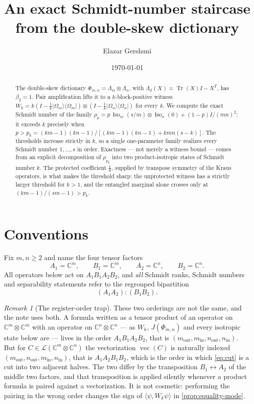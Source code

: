 \documentclass[11pt,reqno]{amsart}
\title{An exact Schmidt-number staircase\\
from the double-skew dictionary}
\author{Elazar Gershuni}
\date{\today}
\theoremstyle{plain}
\theoremstyle{remark}
\newtheorem{remark}[theorem]{Remark}
\DeclareMathOperator{\Tr}{Tr}
\DeclareMathOperator{\vecop}{vec}
\DeclareMathOperator{\Iso}{Iso}
\newcommand{\cL}{\mathcal L}
\newcommand{\ketbra}[2]{\lvert #1\rangle\!\langle #2\rvert}
\newcommand{\ip}[2]{\langle #1,#2\rangle}
\newcommand{\C}{\mathbb C}
\begin{document}
\begin{abstract}
The double-skew dictionary $\Phi_{m,n}=\Lambda_m\otimes\Lambda_n$, with
$\Lambda_d(X)=\Tr(X)I-X^T$, has $\beta_2=1$.  Pair amplification lifts it to a
$k$-block-positive witness
$W_k=k(I-\frac1k\ketbra{\Omega_m}{\Omega_m})
\otimes(I-\frac1k\ketbra{\Omega_n}{\Omega_n})$ for every $k$.  We compute the
exact Schmidt number of the family
$\rho_p=p\,\Iso_m(s/m)\otimes\Iso_n(0)+(1-p)I/(mn)^2$: it exceeds $k$ precisely
when $p>p_k=(km-1)(kn-1)/[(km-1)(kn-1)+kmn(s-k)]$.  The thresholds increase
strictly in $k$, so a single one-parameter family realizes every Schmidt number
$1,\ldots,s$ in order.  Exactness --- not merely a witness bound --- comes from
an explicit decomposition of $\rho_{p_k}$ into two product-isotropic states of
Schmidt number $k$.  The protected coefficient $\frac1k$, supplied by transpose
symmetry of the Kraus operators, is what makes the threshold sharp: the
unprotected witness has a strictly larger threshold for $k>1$, and the
entangled marginal alone crosses only at $(km-1)/(sm-1)>p_k$.
\end{abstract}
\maketitle

\section{Conventions}

Fix $m,n\ge2$ and name the four tensor factors
\[
    A_1=\C^m,\qquad B_1=\C^m,\qquad A_2=\C^n,\qquad B_2=\C^n .
\]
All operators below act on $A_1B_1A_2B_2$, and \emph{all} Schmidt ranks,
Schmidt numbers and separability statements refer to the regrouped
bipartition
\begin{equation}
\label{eq:cut}
    (A_1A_2):(B_1B_2).
\end{equation}

\begin{remark}[The register-order trap]
\label{rem:order}
These two orderings are not the same, and the note uses both.  A formula
written as a tensor product of an operator on $\C^m\otimes\C^m$ with an
operator on $\C^n\otimes\C^n$ --- as $W_k$, $J(\Phi_{m,n})$ and every isotropic
state below are --- lives in the order $A_1B_1A_2B_2$, that is
$(m_{\mathrm{out}},m_{\mathrm{in}},n_{\mathrm{out}},n_{\mathrm{in}})$.  But for
$C\in\cL(\C^m\otimes\C^n)$ the vectorization $\vecop(C)$ is naturally indexed
$(m_{\mathrm{out}},n_{\mathrm{out}},m_{\mathrm{in}},n_{\mathrm{in}})$, that is
$A_1A_2B_1B_2$, which is the order in which \cref{eq:cut} is a cut into two
adjacent halves.  The two differ by the transposition $B_1\leftrightarrow A_2$
of the middle two factors, and that transposition is applied silently whenever
a product formula is paired against a vectorization.  It is not cosmetic:
performing the pairing in the wrong order changes the sign of
$\ip{\psi}{W_k\psi}$ in \cref{prop:equality-mode}.
\end{remark}
\end{document}

